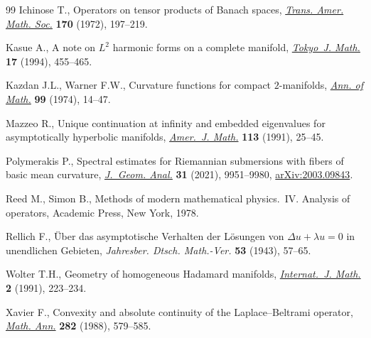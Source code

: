 \documentclass[10pt,a4paper]{amsart}
\numberwithin{equation}{section}
\begin{document}
\begin{thebibliography}{99}
Ichinose T., Operators on tensor products of {B}anach spaces, \href{https://doi.org/10.2307/1996304}{\textit{Trans.
 Amer. Math. Soc.}} \textbf{170} (1972), 197--219.

Kasue A., A note on {$L^2$} harmonic forms on a complete manifold,
 \href{https://doi.org/10.3836/tjm/1270127966}{\textit{Tokyo~J. Math.}} \textbf{17} (1994), 455--465.

Kazdan J.L., Warner F.W., Curvature functions for compact {$2$}-manifolds,
 \href{https://doi.org/10.2307/1971012}{\textit{Ann. of Math.}} \textbf{99} (1974), 14--47.

Mazzeo R., Unique continuation at infinity and embedded eigenvalues for
 asymptotically hyperbolic manifolds, \href{https://doi.org/10.2307/2374820}{\textit{Amer.~J. Math.}} \textbf{113}
 (1991), 25--45.

Polymerakis P., Spectral estimates for {R}iemannian submersions with fibers of
 basic mean curvature, \href{https://doi.org/10.1007/s12220-021-00634-z}{\textit{J.~Geom. Anal.}} \textbf{31} (2021), 9951--9980,
 \href{https://arxiv.org/abs/2003.09843}{arXiv:2003.09843}.

Reed M., Simon B., Methods of modern mathematical physics.~{IV}. {A}nalysis of
 operators, Academic Press, New York, 1978.

Rellich F., \"{U}ber das asymptotische {V}erhalten der {L}\"osungen von
 {$\Delta u+\lambda u=0$} in unendlichen {G}ebieten, \textit{Jahresber. Dtsch.
 Math.-Ver.} \textbf{53} (1943), 57--65.

Wolter T.H., Geometry of homogeneous {H}adamard manifolds, \href{https://doi.org/10.1142/S0129167X91000430}{\textit{Internat.~J.
 Math.}} \textbf{2} (1991), 223--234.

Xavier F., Convexity and absolute continuity of the {L}aplace--{B}eltrami
 operator, \href{https://doi.org/10.1007/BF01462884}{\textit{Math. Ann.}} \textbf{282} (1988), 579--585.

\end{thebibliography}
\end{document}
